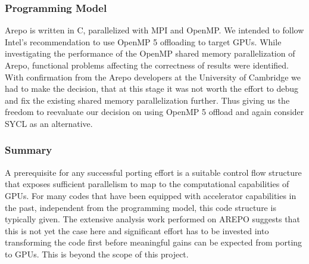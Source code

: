 \documentclass[../main]{subfiles}
\begin{document}
\subsubsection{Programming Model}
Arepo is written in C, parallelized with MPI and OpenMP. We intended to follow Intel’s recommendation to use OpenMP 5 offloading to target GPUs. While investigating the performance of the OpenMP shared memory parallelization of Arepo, functional problems affecting the correctness of results were identified. With confirmation from the Arepo developers at the University of Cambridge we had to make the decision, that at this stage it was not worth the effort to debug and fix the existing shared memory parallelization further. Thus giving us the freedom to reevaluate our decision on using OpenMP 5 offload and again consider SYCL as an alternative. 


\subsubsection{Summary}
A prerequisite for any successful porting effort is a suitable control flow structure that exposes sufficient parallelism to map to the computational capabilities of GPUs. For many codes that have been equipped with accelerator capabilities in the past, independent from the programming model, this code structure is typically given. The extensive analysis work performed on AREPO suggests that this is not yet the case here and significant effort has to be invested into transforming the code first before meaningful gains can be expected from porting to GPUs. This is beyond the scope of this project.




\end{document}
